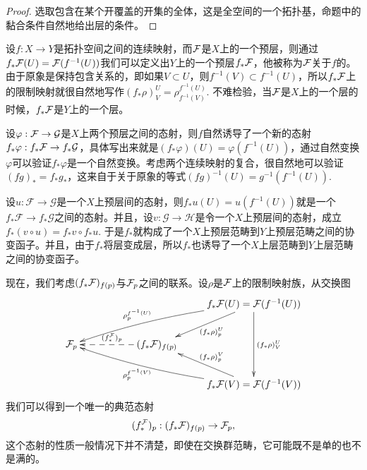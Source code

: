\begin{proof}
选取包含在某个开覆盖的开集的全体，这是全空间的一个拓扑基，命题中的黏合条件自然地给出层的条件。%
\end{proof}

\begin{para}[顺像]\label{sx}
设$f:X\to Y$是拓扑空间之间的连续映射，而$\mathcal{F}$是$X$上的一个预层，则通过$f_*\mathcal{F}(U)=\mathcal{F}(f^{-1}(U))$我们可以定义出$Y$上的一个预层$f_*\mathcal{F}$，他被称为$\mathcal{F}$关于$f$的。 由于原象是保持包含关系的，即如果$V\subset U$，则$f^{-1}(V)\subset f^{-1}(U)$，所以$f_*\mathcal{F}$上的限制映射就很自然地写作$(f_*\rho)^U_V=\rho^{f^{-1}(U)}_{f^{-1}(V)}$. 不难检验，当$\mathcal{F}$是$X$上的一个层的时候，$f_*\mathcal{F}$是$Y$上的一个层。

设$\varphi:\mathcal{F}\to\mathcal{G}$是$X$上两个预层之间的态射，则$f$自然诱导了一个新的态射$f_*\varphi:f_*\mathcal{F}\to f_*\mathcal{G}$，具体写出来就是$(f_*\varphi)(U)=\varphi(f^{-1}(U))$，通过自然变换$\varphi$可以验证$f_*\varphi$是一个自然变换。考虑两个连续映射的复合，很自然地可以验证$(f g)_*=f_* g_*$，这来自于关于原象的等式$(fg)^{-1}(U)=g^{-1}(f^{-1}(U))$. 

设$u:\mathcal{F}\to\mathcal{G}$是一个$X$上预层间的态射，则$f_*u(U)=u(f^{-1}(U))$就是一个$f_*\mathcal{F}\to f_*\mathcal{G}$之间的态射。并且，设$v:\mathcal{G}\to\mathcal{H}$是令一个$X$上预层间的态射，成立$f_*(v\circ u)=f_*v\circ f_* u$. 于是$f_*$就构成了一个$X$上预层范畴到$Y$上预层范畴之间的协变函子。并且，由于$f_*$将层变成层，所以$f_*$也诱导了一个$X$上层范畴到$Y$上层范畴之间的协变函子。
\end{para}



现在，我们考虑$(f_*\mathcal{F})_{f(p)}$与$\mathcal{F}_p$之间的联系。设$\rho$是$\mathcal{F}$上的限制映射族，从交换图
\[
	\xymatrix{
		&&&f_*\calf(U)=\calf(f^{-1}(U))\ar[dl]^{(f_*\rho)_{p}^U}\ar[dd]^{(f_*\rho)^U_{V}}\ar@/_/[llld]_-{\rho_{p}^{f^{-1}(U)}} \\
		\calf_p&&(f_*\calf)_{f(p)}\ar@{-->}[ll]_-{\quad (f_*^\calf)_p}&\\
		&&&f_*\calf(V)=\calf(f^{-1}(V))\ar[ul]_{(f_*\rho)_{p}^V}\ar@/^/[lllu]^-{\rho_{p}^{f^{-1}(V)}}
	}
\]
我们可以得到一个唯一的典范态射
\[
(f_*^{\mathcal{F}})_p:(f_*\mathcal{F})_{f(p)}\to \mathcal{F}_p,
\]
这个态射的性质一般情况下并不清楚，即使在交换群范畴，它可能既不是单的也不是满的。

